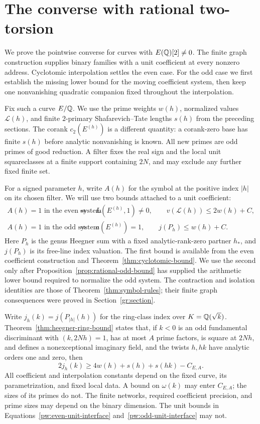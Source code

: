 \section{The converse with rational two-torsion}\label{pw:section}

We prove the pointwise converse for curves with $E(\mathbb Q)[2]\ne0$.
The finite graph construction supplies binary families with a unit coefficient
at every nonzero address.  Cyclotomic interpolation settles the even case.
For the odd case we first establish the missing lower bound for the moving
coefficient system, then keep one nonvanishing quadratic companion fixed
throughout the interpolation.

Fix such a curve $E/\mathbb Q$.  We use the prime weights $w(h)$, normalized values
$\mathcal L(h)$, and finite $2$-primary Shafarevich--Tate lengths $s(h)$
from the preceding sections.  The corank $c_2(E^{(h)})$ is a different
quantity: a corank-zero base has finite $s(h)$ before analytic
nonvanishing is known.  All new primes are odd primes of good reduction.
A filter fixes the real sign and the local unit squareclasses at a finite
support containing $2N$, and may exclude any further fixed finite set.

For a signed parameter $h$, write $A(h)$ for the symbol at the positive
index $|h|$ on its chosen filter.  We will use two bounds attached to a
unit coefficient:
\begin{align}
 A(h)=1\text{ in the even system}\quad&\Longrightarrow\quad
 L(E^{(h)},1)\ne0,\qquad v(\mathcal L(h))\le 2w(h)+C,
 \label{pw:even-unit-interface}\\
 A(h)=1\text{ in the odd system}\quad&\Longrightarrow\quad
 a(E^{(h)})=1,\qquad j(P_h)\le w(h)+C.
 \label{pw:odd-unit-interface}
\end{align}
Here $P_h$ is the genus Heegner sum with a fixed analytic-rank-zero
partner $h_*$, and $j(P_h)$ is its free-line index valuation.
The first bound is available from the even coefficient construction and
Theorem~\ref{thm:cyclotomic-bound}.  We use the second only after
Proposition~\ref{prop:rational-odd-bound} has supplied the arithmetic lower
bound required to normalize the odd system.
The contraction and isolation identities are those of
Theorem~\ref{thm:symbol-rules}; their finite graph consequences were proved
in Section~\ref{gr:section}.

Write $j_h(k)=j(P_{|h|}(h))$ for the ring-class index over $K=\mathbb Q(\sqrt{k})$.
Theorem~\ref{thm:heegner-ring-bound} states that, if
$k<0$ is an odd fundamental discriminant with $(k,2Nh)=1$, has at most
$A$ prime factors, is square at $2Nh$, and defines a nonexceptional
imaginary field, and the twists $h,hk$ have analytic
orders one and zero, then
\begin{equation}\label{pw:ring-lower-interface}
 2j_h(k)\ge4w(h)+s(h)+s(hk)-C_{E,A}.
\end{equation}
All coefficient and interpolation constants depend on the fixed curve,
its parametrization, and fixed local data.  A bound on $\omega(k)$ may
enter $C_{E,A}$; the sizes of its primes do not.  The finite networks,
required coefficient precision, and prime sizes may depend on the binary
dimension.  The unit bounds in Equations~\eqref{pw:even-unit-interface}
and~\eqref{pw:odd-unit-interface} may not.

